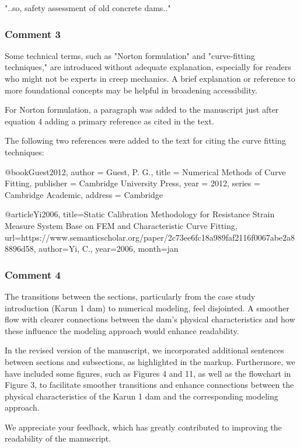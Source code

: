\documentclass{ar2rc}
\begin{document}
{	"..so, safety assessment of old concrete dams.."
	
	\subsubsection{Comment 3}
	\RC Some technical terms, such as "Norton formulation" and "curve-fitting techniques," are introduced without adequate explanation, especially for readers who might not be experts in	creep mechanics. A brief explanation or reference to more foundational concepts may be helpful in broadening accessibility.
	
	\AR For Norton formulation, a paragraph was added to the manuscript just after equation 4 adding a primary reference as cited in the text. 
	
	\AR The following two references were added to the text for citing the curve fitting techniques:
	
	@book{Guest2012,
		author    = {Guest, P. G.},
		title     = {Numerical Methods of Curve Fitting},
		publisher = {Cambridge University Press},
		year      = {2012},
		series    = {Cambridge Academic},
		address   = {Cambridge}
	}
	
	
	@article{Yi2006, 
		title={Static Calibration Methodology for Resistance Strain Measure System Base on FEM and Characteristic Curve Fitting}, 
		url={https://www.semanticscholar.org/paper/2c73ee6fc18a989faf2116f0067abe2a88896d58}, 
		author={Yi, C.}, 
		year={2006}, 
		month=jan 
	}
	
	\subsubsection{Comment 4}
	\RC	The transitions between the sections, particularly from the case study introduction (Karun 1 dam) to numerical modeling, feel disjointed. A smoother flow with clearer connections between the dam's physical characteristics and how these influence the modeling approach would enhance readability.
	
	\AR In the revised version of the manuscript, we incorporated additional sentences between sections and subsections, as highlighted in the markup. Furthermore, we have included some figures, such as Figures 4 and 11, as well as the flowchart in Figure 3, to facilitate smoother transitions and enhance connections between the physical characteristics of the Karun 1 dam and the corresponding modeling approach.
	
	We appreciate your feedback, which has greatly contributed to improving the readability of the manuscript.
	
}
\end{document}
